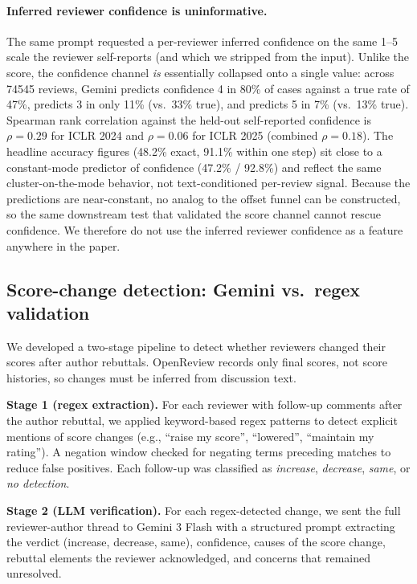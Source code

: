 \documentclass{article}
\begin{document}
\paragraph{Inferred reviewer confidence is uninformative.}
The same prompt requested a per-reviewer inferred confidence on the same 1--5 scale the reviewer self-reports (and which we stripped from the input). Unlike the score, the confidence channel \emph{is} essentially collapsed onto a single value: across \num{74545} reviews, Gemini predicts confidence 4 in 80\% of cases against a true rate of 47\%, predicts 3 in only 11\% (vs.\ 33\% true), and predicts 5 in 7\% (vs.\ 13\% true). Spearman rank correlation against the held-out self-reported confidence is $\rho = 0.29$ for ICLR 2024 and $\rho = 0.06$ for ICLR 2025 (combined $\rho = 0.18$). The headline accuracy figures (48.2\% exact, 91.1\% within one step) sit close to a constant-mode predictor of confidence (47.2\% / 92.8\%) and reflect the same cluster-on-the-mode behavior, not text-conditioned per-review signal. Because the predictions are near-constant, no analog to the offset funnel can be constructed, so the same downstream test that validated the score channel cannot rescue confidence. We therefore do not use the inferred reviewer confidence as a feature anywhere in the paper.

\subsection{Score-change detection: Gemini vs.\ regex validation}\label{app:score-change}

We developed a two-stage pipeline to detect whether reviewers changed their scores after author rebuttals. OpenReview records only final scores, not score histories, so changes must be inferred from discussion text.

\textbf{Stage 1 (regex extraction).} For each reviewer with follow-up comments after the author rebuttal, we applied keyword-based regex patterns to detect explicit mentions of score changes (e.g., ``raise my score'', ``lowered'', ``maintain my rating''). A negation window checked for negating terms preceding matches to reduce false positives. Each follow-up was classified as \emph{increase}, \emph{decrease}, \emph{same}, or \emph{no detection}.

\textbf{Stage 2 (LLM verification).} For each regex-detected change, we sent the full reviewer-author thread to Gemini 3 Flash with a structured prompt extracting the verdict (increase, decrease, same), confidence, causes of the score change, rebuttal elements the reviewer acknowledged, and concerns that remained unresolved.
\end{document}
